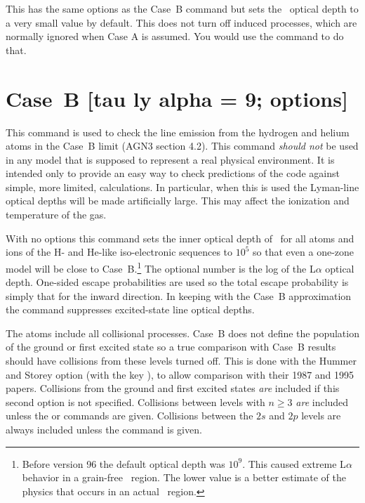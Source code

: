This has the same options as the Case~B command but sets the \la\ optical
depth to a very small value by default.
This does not turn off induced
processes, which are normally ignored when Case A is assumed.
You would
use the  command to do that.

\section{Case~B [tau ly alpha = 9; options]}

This command is used to check the line emission from the hydrogen and
helium atoms in the Case~B limit (AGN3 section 4.2).
This command \emph{should
not} be used in any model that is supposed to represent a real physical
environment.
It is intended only to provide an easy way to check predictions
of the code against simple, more limited, calculations.
In particular,
when this is used the Lyman-line optical depths will be made artificially
large.
This may affect the ionization and temperature of the gas.

With no options this command sets the inner optical depth of
\la\ for all
atoms and ions of the H- and He-like iso-electronic sequences to
$10^5$ so
that even a one-zone model will be close to
Case~B.\footnote{Before version
96 the default optical depth was $10^9$.  This caused
extreme L$\alpha $ behavior in a grain-free \hii\ region.  The lower value is a better
estimate of the physics that occurs in an actual \hii\ region.}
The optional number
is the log of the L$\alpha $ optical depth.
One-sided escape probabilities are
used so the total escape probability is simply that for the inward direction.
In keeping with the Case~B approximation the  command suppresses
excited-state line optical depths.

The atoms include all collisional processes.
Case~B does not define
the population of the ground or first excited state so a true comparison
with Case~B results should have collisions from these levels turned off.
This is done with the Hummer and Storey option (with the key ), to allow
comparison with their 1987 and 1995 papers.
Collisions from the ground
and first excited states \emph{are} included if this second option is not specified.
Collisions between levels with $n\ge  3$ \emph{are} included unless the
or  commands are given.  Collisions
between the $2s$ and $2p$ levels are always included unless the
 command is given.

